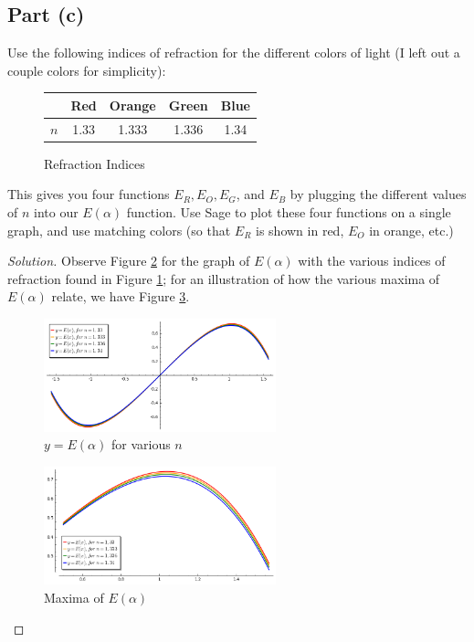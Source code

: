 \documentclass[letterpaper, 12pt]{amsart}
\theoremstyle{definition}  %
\begin{document}
		\subsection*{Part (c)}
		Use the following indices of refraction for the different colors of light (I left out a couple colors for simplicity):

		\begin{figure}[h]
			\begin{tabular}{c|c|c|c|c}
			& Red & Orange & Green & Blue \\
			\hline
			$n$ & 1.33 & 1.333 & 1.336 & 1.34
			\end{tabular}
			\caption{Refraction Indices}
			\label{refractionIndices}
		\end{figure}
		
		This gives you four functions $E_{R}, E_{O}, E_{G}$, and $E_{B}$ by plugging the different values of $n$ into our $E(\alpha)$ function. 
		Use Sage to plot these four functions on a single graph, and use matching colors (so that $E_{R}$ is shown in red, $E_{O}$ in orange, etc.)

		\begin{proof}[Solution]
		Observe Figure \ref{rainbowGraph} for the graph of $E(\alpha)$ with the various indices of refraction found in Figure \ref{refractionIndices}; for an illustration of how the various maxima of $E(\alpha)$ relate, we have Figure \ref{raibowZoom}.

			\begin{figure}[h]
				\includegraphics[width=0.6\textwidth]{figs/e.png}
				\caption{$y = E(\alpha)$ for various $n$}
				\label{rainbowGraph}
			\end{figure}

			\begin{figure}[h]
				\includegraphics[width=0.6\textwidth]{figs/f.png}
				\caption{Maxima of $E(\alpha)$}
				\label{raibowZoom}
			\end{figure}
		\end{proof}
\end{document}
